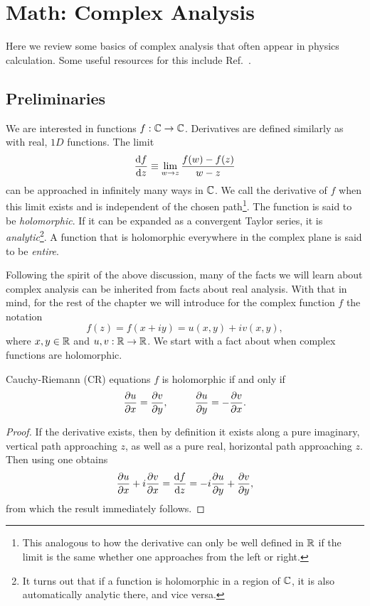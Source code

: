 \chapter{Math: Complex Analysis} 

Here we review some basics of complex analysis that often appear in physics
calculation. Some useful resources for this include
Ref.~\cite{brown_complex_2003,weber_essentials_2012}.

\section{Preliminaries}\label{sec:complexPrelim}

We are interested in functions $f:\mathbb{C}\to\mathbb{C}$. Derivatives are defined similarly as
with real, $1D$ functions. The limit
\begin{equation}\label{eq:cderiv}
  \dv{f}{z}\equiv\lim_{w\to z}\frac{f(w)-f(z)}{w-z}
\end{equation}
can be approached in infinitely many ways in $\mathbb{C}$. We call 
the derivative of $f$ when this limit exists and is independent of the chosen
path\footnote{This analogous to how the derivative can only be well defined in
$\mathbb{R}$ if the limit is the same whether one approaches from the left or right.}.
The function is said to be {\it holomorphic}. If it can be expanded as a
convergent Taylor series, it is {\it analytic}\footnote{It turns out
that if a function is holomorphic in a region of $\mathbb{C}$, it is also
automatically analytic there, and vice versa.}.
 A function that is holomorphic
everywhere in the complex plane is said to be {\it entire}.


Following the spirit of the above discussion, many of the facts we will learn
about complex analysis can be inherited from facts about real analysis. With
that in mind, for the rest of the chapter we will introduce for the complex
function $f$ the notation
\begin{equation}
  f(z)=f(x+iy)=u(x,y)+iv(x,y),
\end{equation}
where $x,y\in\mathbb{R}$ and $u,v:\mathbb{R}\to\mathbb{R}$. We start with a fact about when complex
functions are holomorphic.
\begin{theorem}{Cauchy-Riemann (CR) equations}{}
$f$ is holomorphic if and only if
$$
  \pdv{u}{x}=\pdv{v}{y},~~~~~~~~\pdv{u}{y}=-\pdv{v}{x}.
$$
\begin{proof}
If the derivative exists, then by definition
it exists along a pure imaginary, vertical path approaching $z$, as well
as a pure real, horizontal path approaching $z$.
Then using  one obtains
$$
\pdv{u}{x}+i\pdv{v}{x}=\dv{f}{z}=-i\pdv{u}{y}+\pdv{v}{y},
$$
from which the result immediately follows.
\end{proof}
\end{theorem}

